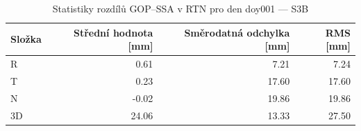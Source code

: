 \begin{table}[H]
\centering
\caption{Statistiky rozdílů GOP–SSA v RTN pro den doy001 — S3B}
\label{tab:gop_vs_ssa_s3b_doy001_day_stats}
\begin{tabular}{lrrr}
\toprule
Složka & Střední hodnota [mm] & Směrodatná odchylka [mm] & RMS [mm] \\
\midrule
R & 0.61 & 7.21 & 7.24 \\
T & 0.23 & 17.60 & 17.60 \\
N & -0.02 & 19.86 & 19.86 \\
3D & 24.06 & 13.33 & 27.50 \\
\bottomrule
\end{tabular}
\end{table}
